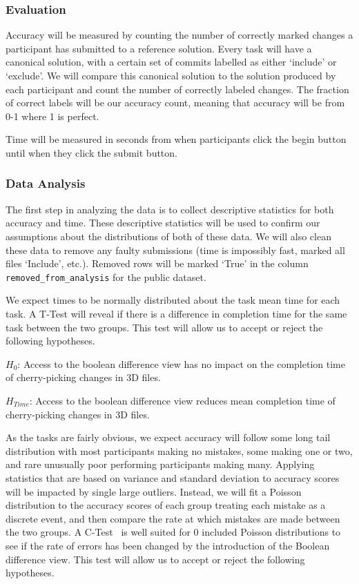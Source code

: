 \documentclass[sigconf,authorversion,nonacm]{acmart}
\begin{document}
\subsubsection{Evaluation}

Accuracy will be measured by counting the number of correctly marked changes a participant has submitted to a reference solution.
Every task will have a canonical solution, with a certain set of commits labelled as either `include' or `exclude'.
We will compare this canonical solution to the solution produced by each participant and count the number of correctly labeled changes.
The fraction of correct labels will be our accuracy count, meaning that accuracy will be from 0-1 where 1 is perfect.

Time will be measured in seconds from when participants click the begin button until when they click the submit button.

\subsubsection{Data Analysis}

The first step in analyzing the data is to collect descriptive statistics for both accuracy and time.
These descriptive statistics will be used to confirm our assumptions about the distributions of both of these data.
We will also clean these data to remove any faulty submissions (time is impossibly fast, marked all files `Include', etc.).
Removed rows will be marked `True' in the column \texttt{removed\_from\_analysis} for the public dataset.

We expect times to be normally distributed about the task mean time for each task.
A T-Test will reveal if there is a difference in completion time for the same task between the two groups.
This test will allow us to accept or reject the following hypotheses.

$H_{0}$: Access to the boolean difference view has no impact on the completion time of cherry-picking changes in 3D files.

$H_{Time}$: Access to the boolean difference view reduces mean completion time of cherry-picking changes in 3D files.

As the tasks are fairly obvious, we expect accuracy will follow some long tail distribution with most participants making no mistakes, some making one or two, and rare unusually poor performing participants making many.
Applying statistics that are based on variance and standard deviation to accuracy scores will be impacted by single large outliers.
Instead, we will fit a Poisson distribution to the accuracy scores of each group treating each mistake as a discrete event, and then compare the rate at which mistakes are made between the two groups.
A C-Test~\cite{przyborowski1940homogeneity} is well suited for 0 included Poisson distributions to see if the rate of errors has been changed by the introduction of the Boolean difference view.
This test will allow us to accept or reject the following hypotheses.
\end{document}
